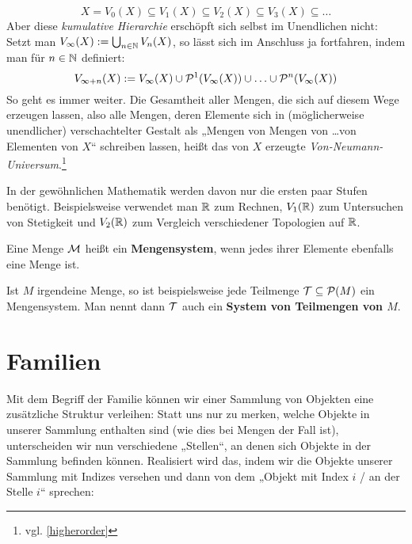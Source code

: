 \begin{vorschau}
\begin{enumerate}[(1)]
        \[ X=V_0(X) \subseteq V_1(X) \subseteq V_2(X) \subseteq V_3(X) \subseteq \ldots \]
        Aber diese \emph{kumulative Hierarchie} erschöpft sich selbst im Unendlichen nicht: Setzt man $V_\infty(X):=\bigcup_{n\in \mathbb N} V_n(X)$, so lässt sich im Anschluss ja fortfahren, indem man für $n\in \mathbb N$ definiert:
        \[ V_{\infty+n}(X):=V_\infty(X)\cup\mathcal P^1(V_\infty(X))\cup\ldots\cup \mathcal P^n(V_\infty(X)) \]
        So geht es immer weiter. Die Gesamtheit aller Mengen, die sich auf diesem Wege erzeugen lassen, also alle Mengen, deren Elemente sich in (möglicherweise unendlicher) verschachtelter Gestalt als „Mengen von Mengen von \dots von Elementen von $X$“ schreiben lassen, heißt das von $X$ erzeugte \emph{Von-Neumann-Universum}.\footnote{vgl. \cref{higherorder}}

        In der gewöhnlichen Mathematik werden davon nur die ersten paar Stufen benötigt. Beispielsweise verwendet man $\mathbb R$ zum Rechnen, $V_1(\mathbb R)$ zum Untersuchen von Stetigkeit und $V_2(\mathbb R)$ zum Vergleich verschiedener Topologien auf $\mathbb R$.
    \end{enumerate}
\end{vorschau}


\begin{defin}[Mengensystem]  
    Eine Menge $\mathcal M$ heißt ein \textbf{Mengensystem}, wenn jedes ihrer Elemente ebenfalls eine Menge ist.

    Ist $M$ irgendeine Menge, so ist beispielsweise jede Teilmenge $\mathcal T\subseteq \mathcal P(M)$ ein Mengensystem. Man nennt dann $\mathcal T$ auch ein \textbf{System von Teilmengen von $M$}.
\end{defin}





\section{Familien}


Mit dem Begriff der Familie können wir einer Sammlung von Objekten eine zusätzliche Struktur verleihen: Statt uns nur zu merken, welche Objekte in unserer Sammlung enthalten sind (wie dies bei Mengen der Fall ist), unterscheiden wir nun verschiedene „Stellen“, an denen sich Objekte in der Sammlung befinden können. Realisiert wird das, indem wir die Objekte unserer Sammlung mit Indizes versehen und dann von dem „Objekt mit Index $i$ / an der Stelle $i$“ sprechen:


